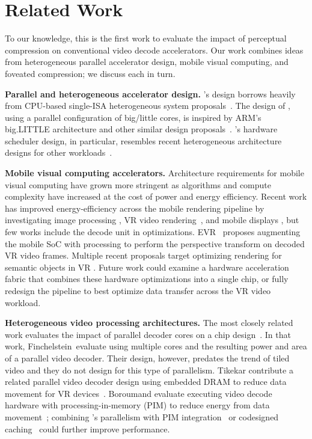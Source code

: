 \section{Related Work}

To our knowledge, this is the first work to evaluate the impact of perceptual compression on conventional video decode accelerators.
Our work combines ideas from heterogeneous parallel accelerator design, mobile visual computing, and foveated compression; we discuss each in turn.

\textbf{Parallel and heterogeneous accelerator design. } \nameArch's design borrows heavily from CPU-based single-ISA heterogeneous system proposals~\cite{Kumar2003micro}.
The design of \nameArch, using a parallel configuration of big/little cores, is inspired by ARM's big.LITTLE architecture and other similar design proposals~\cite{armBigLittle}.
\nameArch's hardware scheduler design, in particular, resembles recent heterogeneous architecture designs for other workloads~\cite{pie2012isca, 6522303}.

\textbf{Mobile visual computing accelerators. }Architecture requirements for mobile visual computing have grown more stringent as algorithms and compute complexity have increased at the cost of power and energy efficiency.
Recent work has improved energy-efficiency across the mobile rendering pipeline by investigating image processing \cite{pu2017taco, qadeer}, VR video rendering~\cite{evr19isca}, and mobile displays \cite{zhang2017race, crayon}, but few works include the decode unit in optimizations.
EVR~\cite{evr19isca} proposes augmenting the mobile SoC with processing to perform the perspective transform on decoded VR video frames.
Multiple recent proposals target optimizing rendering for semantic objects in VR \cite{xie2019isca,leng2018semantic}.
Future work could examine a hardware acceleration fabric that combines these hardware optimizations into a single chip, or fully redesign the pipeline to best optimize data transfer across the VR video workload.

\textbf{Heterogeneous video processing architectures. }The most closely related work evaluates the impact of parallel decoder cores on a \avc chip design~\cite{multicore-avc}.
In that work, Finchelstein~\etal evaluate using multiple cores and the resulting power and area of a parallel video decoder.
Their design, however, predates the trend of tiled video and they do not design for this type of parallelism.
Tikekar \etal contribute a related parallel video decoder design using embedded DRAM to reduce data movement for VR devices~\cite{tikekar18ijssc}.
Boroumand \etal evaluate executing video decode hardware with processing-in-memory (PIM) to reduce energy from data movement~\cite{google2018asplos}; combining \nameArch's parallelism with PIM integration~\cite{8675230} or codesigned caching~\cite{zhang2017race} could further improve performance.

